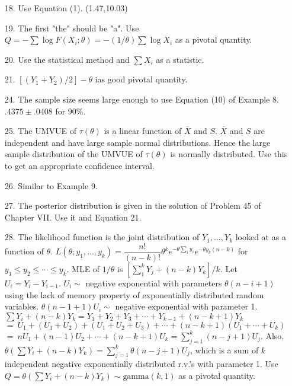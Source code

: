 \begin{enumerate}
	\item[18.] Use Equation (1). (1.47,10.03)
	
	\item[19.] The first "the" should be "a". Use $Q = -\sum\log F(X_i;\theta) = -(1/\theta)\sum \log X_i$ as a pivotal quantity.
	
	\item[20.] Use the statistical method and $\sum X_i$ as a statistic.
	
	\item[21.] $[(Y_1+Y_2)/2] - \theta$ ias good pivotal quantity.
	
	\item[24.] The sample size seems large enough to use Equation (10) of Example 8. \\
	$.4375 \pm .0408$ for 90\%. 
	
	\item[25.] The UMVUE of $\tau(\theta)$ is a linear function of $\overline{X}$ and $S$.  $\overline{X}$ and $S$ are independent and have large sample normal distributions. Hence the large sample distribution of the UMVUE of $\tau(\theta)$ is normally distributed. Use this to get an appropriate confidence interval.
	
	\newpage
	
	\item[26.] Similar to Example 9.
	
	\item[27.] The posterior distribution is given in the solution of Problem 45 of Chapter VII. Use it and Equation 21.
	
	\item[28.] The likelihood function is the joint distribution of $Y_1, \ldots, Y_k$ looked at as a function of $\theta$. $L(\theta;y_1,\ldots,y_k) = \dfrac{n!}{(n-k)!}\theta^ke^{-\theta\sum\limits_i y_i}e^{-\theta y_k(n-k)}$ for $y_1\le y_2\le \cdots\le y_k$. MLE of $1/\theta$ is $[\sum\limits_1^k Y_j + (n-k)Y_k]/k$. Let $U_i = Y_i-Y_{i-1}$. $U_i\sim$ negative exponential with parameters $\theta(n-i+1)$ using the lack of memory property of exponentially distributed random variables. $\theta(n-1+1)U_i\sim$ negative exponential with parameter 1. \\
	$\sum Y_i+ (n-k)Y_k = Y_1 + Y_2 + Y_3 + \cdots + Y_{k-1} + (n-k+1)Y_k$ \\
	$=\ U_1 + (U_1+U_2) + (U_1+U_2+U_3) + \cdots + (n-k+1)(U_1+\cdots+U_k)$ \\
	$=\ nU_1 + (n-1)U_2 + \cdots + (n-k+1)U_k = \sum\limits_{j=1}^k (n-j+1)U_j$. Also, \\
	$\theta(\sum Y_i + (n-k)Y_k) = \sum\limits_{j=1}^k \theta(n-j+1)U_j$, which is a sum of $k$ independent negative exponentially distributed r.v.'s with parameter 1. Use $Q=\theta(\sum Y_i + (n-k)Y_k) \sim \mbox{gamma}(k,1)$ as a pivotal quantity.  
	
\end{enumerate}